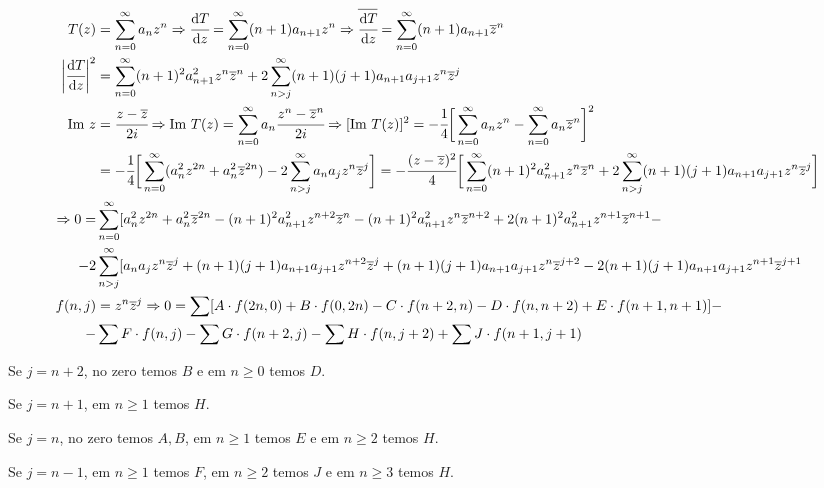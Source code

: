\documentclass[10pt,a4paper]{article}
\begin{document}
 \begin{align*}
 T(z) &= \sum_{n = 0}^\infty a_n z^n \Rightarrow \cfrac{\mathrm{d}T}{\mathrm{d}z} = \sum_{n = 0}^\infty (n + 1) a_{n + 1} z^n \Rightarrow \overline{\cfrac{\mathrm{d}T}{\mathrm{d}z}} = \sum_{n = 0}^\infty (n + 1) a_{n + 1} \overline{z}^n \\
 \bigg\vert \cfrac{\mathrm{d}T}{\mathrm{d}z} \bigg\vert^2 &= \sum_{n = 0}^\infty (n + 1)^2 a_{n + 1}^2 z^n \overline{z}^n + 2 \sum_{n > j}^\infty (n + 1)(j + 1) a_{n + 1} a_{j+1} z^n \overline{z}^j \\
 \text{Im } z &= \cfrac{z - \overline{z}}{2i} \Rightarrow \text{Im } T(z) = \sum_{n = 0}^\infty a_n \cfrac{z^n - \overline{z}^n}{2i} \Rightarrow [\text{Im } T(z)]^2 = -\cfrac{1}{4} \bigg[ \sum_{n = 0}^\infty a_n z^n - \sum_{n = 0}^\infty a_n \overline{z}^n \bigg]^2 \\
 &= -\cfrac{1}{4} \bigg[ \sum_{n = 0}^\infty (a_n^2 z^{2n} + a_n^2 \overline{z}^{2n}) - 2 \sum_{n > j}^\infty a_n a_j z^n \overline{z}^j \bigg] = -\cfrac{(z - \overline{z})^2}{4} \bigg[ \sum_{n = 0}^\infty (n + 1)^2 a_{n + 1}^2 z^n \overline{z}^n + 2 \sum_{n > j}^\infty (n + 1)(j + 1) a_{n + 1} a_{j+1}  z^n \overline{z}^j \bigg] \\
 \Rightarrow 0 = &\sum_{n = 0}^\infty [a_n^2 z^{2n} + a_n^2 \overline{z}^{2n} - (n + 1)^2 a_{n + 1}^2 z^{n+2} \overline{z}^n - (n + 1)^2 a_{n + 1}^2 z^n \overline{z}^{n + 2} + 2 (n + 1)^2 a_{n + 1}^2 z^{n+1} \overline{z}^{n +1} - \\
 - 2 &\sum_{n > j}^\infty [a_n a_j z^n \overline{z}^j + (n + 1)(j + 1) a_{n + 1} a_{j+1}  z^{n + 2} \overline{z}^j + (n + 1)(j + 1) a_{n + 1} a_{j+1}  z^n \overline{z}^{j + 2} - 2 (n + 1)(j + 1) a_{n + 1} a_{j+1}  z^{n+1} \overline{z}^{j + 1} \\
 f(n, j) &= z^n \overline{z}^j \Rightarrow 0 = \sum [A \cdot f(2n, 0) + B \cdot f(0, 2n) - C \cdot f(n + 2, n) - D \cdot f(n, n + 2) + E \cdot f(n+1, n+1)] - \\
 - &\sum F \cdot f(n, j) - \sum G \cdot f(n+2, j) - \sum H \cdot f(n, j + 2) + \sum J \cdot f(n+1, j+1)
 \end{align*}

 Se $j = n + 2$, no zero temos $B$ e em $n \ge 0$ temos $D$.

 Se $j = n + 1$, em $n \ge 1$ temos $H$.

 Se $j = n$, no zero temos $A, B$, em $n \ge 1$ temos $E$ e em $n \ge 2$ temos $H$.

 Se $j = n - 1$, em $n \ge 1$ temos $F$, em $n \ge 2$ temos $J$ e em $n \ge 3$ temos $H$.
\end{document}

